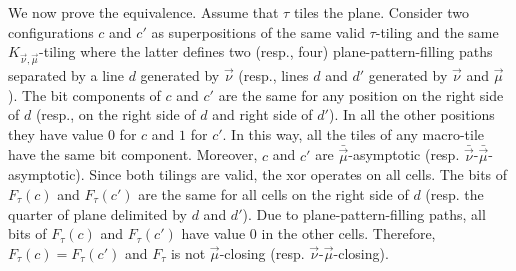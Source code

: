 \documentclass{llncs}
\newcommand{\nn}{\vec\nu}
\newcommand{\mm}{\vec \mu}
\begin{document}
We now prove the equivalence. Assume that $\tau$ tiles the plane. Consider two  configurations $c$ and $c'$ as superpositions of the  
same valid $\tau$-tiling and the same $K_{\nn,\mm}$-tiling where the latter defines two (resp., four) plane-pattern-filling paths
separated by a line $d$ generated by $\nn$ (resp., lines $d$ and $d'$ generated by $\nn$ and
$\mm$). The bit components of $c$ and $c'$ are the same for any position
 on the right side of $d$
 (resp., on the right side of  $d$ and right side of $d'$). In all the other
positions they have value $0$ for $c$ and $1$ for $c'$. In this way, all the tiles of any macro-tile have the same bit component.  Moreover, $c$ and $c'$ are $\bar{\mm}$-asymptotic (resp.
$\bar{\nn}$-$\bar{\mm}$-asymptotic). 
Since both tilings are valid, 
the xor operates on all cells. The bits of $F_{\tau}(c)$ and $F_{\tau}(c')$ are the same for all cells on the right side of $d$ (resp. the quarter of plane delimited by $d$ and $d'$). Due to plane-pattern-filling paths, all bits of $F_{\tau}(c)$ and $F_{\tau}(c')$ have value $0$ in the other cells. Therefore, $F_{\tau}(c)=F_{\tau}(c')$ and $F_{\tau}$ is not
$\mm$-closing (resp. $\nn$-$\mm$-closing).
\end{document}
